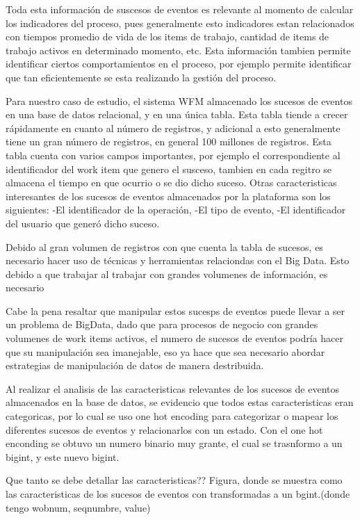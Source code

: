 Toda esta información de suscesos de eventos es relevante al momento de calcular los indicadores del proceso, pues generalmente esto indicadores estan relacionados con tiempos promedio de vida de los items de trabajo, cantidad de items de trabajo activos en determinado momento, etc. Esta información tambien permite identificar ciertos comportamientos en el proceso, por ejemplo permite identificar que tan eficientemente se esta realizando la gestión del proceso. 

Para nuestro caso de estudio, el sistema WFM almacenado los sucesos de eventos en una base de datos relacional, y en una única tabla. Esta tabla tiende a crecer rápidamente en cuanto al número de registros, y adicional a esto generalmente tiene un gran número de registros, en general 100 millones de registros. Esta tabla cuenta con varios campos importantes, por ejemplo el correspondiente al identificador del work item que genero el susceso, tambien en cada regitro se almacena el tiempo en que ocurrio o se dio dicho suceso. Otras caracteristicas interesantes de los sucesos de eventos almacenados por la plataforma son los siguientes:
-El identificador de la operación, 
-El tipo de evento, 
-El identificador del usuario que generó dicho suceso.

Debido al gran volumen de registros con que cuenta la tabla de sucesos, es necesario hacer uso de técnicas y herramientas relaciondas con el Big Data. Esto debido a que trabajar al trabajar con grandes volumenes de información, es necesario

Cabe la pena resaltar que manipular estos sucesps de eventos puede llevar a ser un problema de BigData, dado que para procesos de negocio con grandes volumenes de work items activos, el numero de sucesos de eventos podría hacer que su manipulación sea imanejable, eso ya hace que sea necesario abordar estrategias de manipulación de datos de manera destribuida.

Al realizar el analisis de las caracteristicas relevantes de los sucesos de eventos almacenados en la base de datos, se evidencio que todos estas caracteristicas eran categoricas, por lo cual se uso one hot encoding para categorizar o mapear los diferentes sucesos de eventos y relacionarlos con un estado. Con el one hot enconding se obtuvo un numero binario muy grante, el cual se trasnformo a un bigint, y este nuevo bigint.

Que tanto se debe detallar las caracteristicas??
Figura, donde se muestra como las caracteristicas de los sucesos de eventos con transformadas a un bgint.(donde tengo wobnum, seqnumbre, value)


